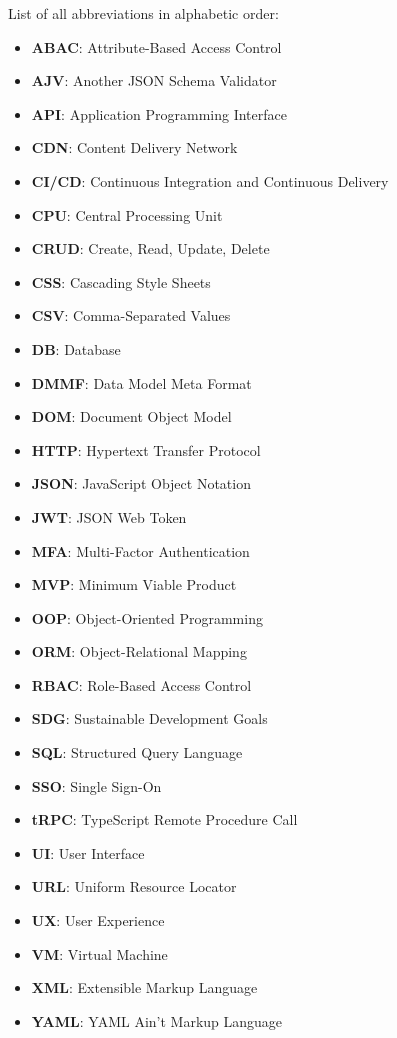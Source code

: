 
List of all abbreviations in alphabetic order: \\

\begin{itemize}
\item \textbf{ABAC}: Attribute-Based Access Control
\item \textbf{AJV}: Another JSON Schema Validator
\item \textbf{API}: Application Programming Interface
\item \textbf{CDN}: Content Delivery Network
\item \textbf{CI/CD}: Continuous Integration and Continuous Delivery
\item \textbf{CPU}: Central Processing Unit
\item \textbf{CRUD}: Create, Read, Update, Delete
\item \textbf{CSS}: Cascading Style Sheets
\item \textbf{CSV}: Comma-Separated Values 
\item \textbf{DB}: Database
\item \textbf{DMMF}: Data Model Meta Format 
\item \textbf{DOM}: Document Object Model 
\item \textbf{HTTP}: Hypertext Transfer Protocol
\item \textbf{JSON}: JavaScript Object Notation
\item \textbf{JWT}: JSON Web Token
\item \textbf{MFA}: Multi-Factor Authentication
\item \textbf{MVP}: Minimum Viable Product
\item \textbf{OOP}: Object-Oriented Programming
\item \textbf{ORM}: Object-Relational Mapping
\item \textbf{RBAC}: Role-Based Access Control
\item \textbf{SDG}: Sustainable Development Goals
\item \textbf{SQL}: Structured Query Language
\item \textbf{SSO}: Single Sign-On
\item \textbf{tRPC}: TypeScript Remote Procedure Call
\item \textbf{UI}: User Interface
\item \textbf{URL}: Uniform Resource Locator
\item \textbf{UX}: User Experience
\item \textbf{VM}: Virtual Machine
\item \textbf{XML}: Extensible Markup Language
\item \textbf{YAML}: YAML Ain't Markup Language

\end{itemize}
